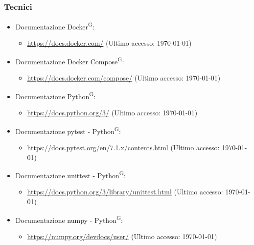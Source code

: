 \documentclass[8pt]{article}
\newcommand{\glossterm}[1]{#1\textsuperscript{G}} %
\begin{document}
\subsubsection{Tecnici}
\begin{itemize}
	\setlength\itemsep{0em}
    \item Documentazione \glossterm{Docker}:
    \begin{itemize}
	\setlength\itemsep{0em}
		\item \href{https://docs.docker.com/}{\color{myblue}https://docs.docker.com/} (Ultimo accesso: \today)
	\end{itemize}
    \item Documentazione \glossterm{Docker Compose}:
    \begin{itemize}
	\setlength\itemsep{0em}
		\item \href{https://docs.docker.com/compose/}{\color{myblue}https://docs.docker.com/compose/} (Ultimo accesso: \today)
	\end{itemize}
    \item Documentazione \glossterm{Python}:
    \begin{itemize}
	\setlength\itemsep{0em}
		\item \href{https://docs.python.org/3/}{\color{myblue}https://docs.python.org/3/} (Ultimo accesso: \today)
	\end{itemize}
    \item Documentazione pytest - \glossterm{Python}:
    \begin{itemize}
	\setlength\itemsep{0em}
		\item \href{https://docs.pytest.org/en/7.1.x/contents.html}{\color{myblue}https://docs.pytest.org/en/7.1.x/contents.html} (Ultimo accesso: \today)
	\end{itemize}
    \item Documentazione unittest - \glossterm{Python}:
    \begin{itemize}
	\setlength\itemsep{0em}
		\item \href{https://docs.python.org/3/library/unittest.html}{\color{myblue}https://docs.python.org/3/library/unittest.html} (Ultimo accesso: \today)
	\end{itemize}
    \item Documentazione numpy - \glossterm{Python}:
    \begin{itemize}
	\setlength\itemsep{0em}
		\item \href{https://numpy.org/devdocs/user/}{\color{myblue}https://numpy.org/devdocs/user/} (Ultimo accesso: \today)
	\end{itemize}

\end{itemize}
\end{document}
